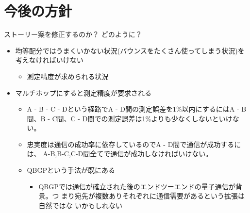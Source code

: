 \documentclass[conference]{IEEEtran}
\begin{document}
\section{今後の方針}
\label{sec:org7c09653}
ストーリー案を修正するのか？
どのように？
\begin{itemize}
\item 均等配分ではうまくいかない状況(バウンスをたくさん使ってしまう状況)を考えなければいけない
\begin{itemize}
\item 測定精度が求められる状況
\end{itemize}
\item マルチホップにすると測定精度が要求される
\begin{itemize}
\item A - B - C - Dという経路でA - D間の測定誤差を1\%以内にするにはA - B
間、B - C間、C - D間での測定誤差は1\%よりも少なくしないといけない。
\item 忠実度は通信の成功率に依存しているのでA - D間で通信が成功するには、
A-B,B-C,C-D間全てで通信が成功しなければいけない。
\item QBGPという手法が既にある
\begin{itemize}
\item QBGPでは通信が確立された後のエンドツーエンドの量子通信が背景。つ
まり宛先が複数ありそれぞれに通信需要があるという拡張は自然ではな
いかもしれない
\end{itemize}
\end{itemize}
\end{itemize}
\end{document}
